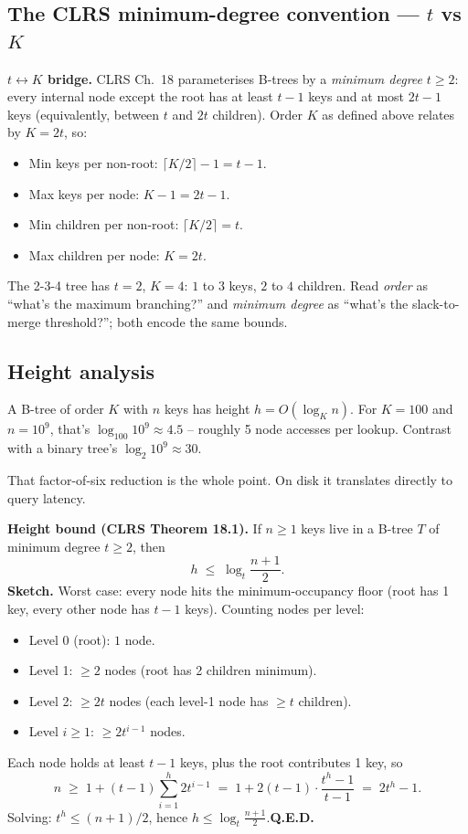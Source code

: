 \documentclass[11pt]{article}
\begin{document}
\subsection*{The CLRS minimum-degree convention --- $t$ vs $K$}

\begin{notebox}
\textbf{$t \leftrightarrow K$ bridge.} CLRS Ch.~18 parameterises
B-trees by a \emph{minimum degree} $t \ge 2$: every internal node
except the root has at least $t-1$ keys and at most $2t-1$ keys
(equivalently, between $t$ and $2t$ children). Order $K$ as defined
above relates by $K = 2t$, so:
\begin{itemize}[leftmargin=*]
    \item Min keys per non-root: $\lceil K/2 \rceil - 1 = t - 1$.
    \item Max keys per node: $K - 1 = 2t - 1$.
    \item Min children per non-root: $\lceil K/2 \rceil = t$.
    \item Max children per node: $K = 2t$.
\end{itemize}
The 2-3-4 tree has $t = 2$, $K = 4$: $1$ to $3$ keys, $2$ to $4$
children. Read \emph{order} as ``what's the maximum branching?''
and \emph{minimum degree} as ``what's the slack-to-merge
threshold?''; both encode the same bounds.
\end{notebox}

\subsection*{Height analysis}

A B-tree of order $K$ with $n$ keys has height $h = O(\log_K n)$. For $K = 100$ and $n = 10^9$, that's $\log_{100} 10^9 \approx 4.5$ -- roughly 5 node accesses per lookup. Contrast with a binary tree's $\log_2 10^9 \approx 30$.

That factor-of-six reduction is the whole point. On disk it translates directly to query latency.

\begin{defnbox}
\textbf{Height bound (CLRS Theorem 18.1).} If $n \ge 1$ keys live in
a B-tree $T$ of minimum degree $t \ge 2$, then
\[
    h \;\le\; \log_t \frac{n+1}{2}.
\]
\textbf{Sketch.} Worst case: every node hits the minimum-occupancy
floor (root has 1 key, every other node has $t-1$ keys). Counting
nodes per level:
\begin{itemize}[leftmargin=*]
    \item Level 0 (root): $1$ node.
    \item Level 1: $\ge 2$ nodes (root has 2 children minimum).
    \item Level 2: $\ge 2t$ nodes (each level-1 node has $\ge t$
          children).
    \item Level $i \ge 1$: $\ge 2t^{i-1}$ nodes.
\end{itemize}
Each node holds at least $t-1$ keys, plus the root contributes 1 key,
so
\[
    n \;\ge\; 1 + (t-1) \sum_{i=1}^{h} 2t^{i-1}
        \;=\; 1 + 2(t-1) \cdot \frac{t^h - 1}{t-1}
        \;=\; 2t^h - 1.
\]
Solving: $t^h \le (n+1)/2$, hence $h \le \log_t \frac{n+1}{2}$.\hfill\textbf{Q.E.D.}
\end{defnbox}
\end{document}
